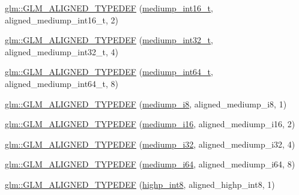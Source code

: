 \begin{DoxyCompactItemize}
\item 
\hyperlink{group__gtx__type__aligned_ga2196442c0e5c5e8c77842de388c42521}{glm\+::\+G\+L\+M\+\_\+\+A\+L\+I\+G\+N\+E\+D\+\_\+\+T\+Y\+P\+E\+D\+EF} (\hyperlink{group__gtc__type__precision_ga478fab608cf43040013d719a3e03b194}{mediump\+\_\+int16\+\_\+t}, aligned\+\_\+mediump\+\_\+int16\+\_\+t, 2)
\item 
\hyperlink{group__gtx__type__aligned_ga1284488189daf897cf095c5eefad9744}{glm\+::\+G\+L\+M\+\_\+\+A\+L\+I\+G\+N\+E\+D\+\_\+\+T\+Y\+P\+E\+D\+EF} (\hyperlink{group__gtc__type__precision_gafd9b4bd9e4465aec63351b59100692c4}{mediump\+\_\+int32\+\_\+t}, aligned\+\_\+mediump\+\_\+int32\+\_\+t, 4)
\item 
\hyperlink{group__gtx__type__aligned_ga73fdc86a539808af58808b7c60a1c4d8}{glm\+::\+G\+L\+M\+\_\+\+A\+L\+I\+G\+N\+E\+D\+\_\+\+T\+Y\+P\+E\+D\+EF} (\hyperlink{group__gtc__type__precision_ga555a2f85641550c232db473a9bb981f7}{mediump\+\_\+int64\+\_\+t}, aligned\+\_\+mediump\+\_\+int64\+\_\+t, 8)
\item 
\hyperlink{group__gtx__type__aligned_gafafeea923e1983262c972e2b83922d3b}{glm\+::\+G\+L\+M\+\_\+\+A\+L\+I\+G\+N\+E\+D\+\_\+\+T\+Y\+P\+E\+D\+EF} (\hyperlink{group__gtc__type__precision_ga28a8b5fd51072680bb55178c17cc7411}{mediump\+\_\+i8}, aligned\+\_\+mediump\+\_\+i8, 1)
\item 
\hyperlink{group__gtx__type__aligned_ga4b35ca5fe8f55c9d2fe54fdb8d8896f4}{glm\+::\+G\+L\+M\+\_\+\+A\+L\+I\+G\+N\+E\+D\+\_\+\+T\+Y\+P\+E\+D\+EF} (\hyperlink{group__gtc__type__precision_ga8454fc6a82c7bb787d0ac9663e08f63d}{mediump\+\_\+i16}, aligned\+\_\+mediump\+\_\+i16, 2)
\item 
\hyperlink{group__gtx__type__aligned_ga63b882e29170d428463d99c3d630acc6}{glm\+::\+G\+L\+M\+\_\+\+A\+L\+I\+G\+N\+E\+D\+\_\+\+T\+Y\+P\+E\+D\+EF} (\hyperlink{group__gtc__type__precision_ga5e00ec824eb55968a6b6496f294d8c07}{mediump\+\_\+i32}, aligned\+\_\+mediump\+\_\+i32, 4)
\item 
\hyperlink{group__gtx__type__aligned_ga8b20507bb048c1edea2d441cc953e6f0}{glm\+::\+G\+L\+M\+\_\+\+A\+L\+I\+G\+N\+E\+D\+\_\+\+T\+Y\+P\+E\+D\+EF} (\hyperlink{group__gtc__type__precision_ga90fedf6c701ffbe00535156715e50787}{mediump\+\_\+i64}, aligned\+\_\+mediump\+\_\+i64, 8)
\item 
\hyperlink{group__gtx__type__aligned_ga56c5ca60813027b603c7b61425a0479d}{glm\+::\+G\+L\+M\+\_\+\+A\+L\+I\+G\+N\+E\+D\+\_\+\+T\+Y\+P\+E\+D\+EF} (\hyperlink{group__gtc__type__precision_ga57c86999e666760c304453f9bfdc09d1}{highp\+\_\+int8}, aligned\+\_\+highp\+\_\+int8, 1)

\end{DoxyCompactItemize}
